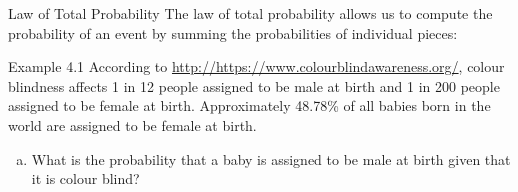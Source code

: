 \documentclass[aspectratio=169,xcolor=pdftex,dvipsnames,table]{beamer}\usepackage[]{graphicx}\usepackage[]{xcolor}
\begin{document}
\begin{frame}{Law of Total Probability}
  The law of total probability allows us to compute the probability of an event by summing the probabilities of individual pieces:
  
  \begin{center}
\end{center}

\end{frame}

\begin{frame}
  \begin{block}{Example 4.1}
    According to \url{http://https://www.colourblindawareness.org/}, colour blindness affects 1 in 12 people assigned to be male at birth and 1 in 200 people assigned to be female at birth. Approximately 48.78\% of all babies born in the world are assigned to be female at birth.

    \begin{enumerate}[d)]
      
    \item What is the probability that a baby is assigned to be male at birth given that it is colour blind?
      
    \end{enumerate}
  \end{block}
\end{frame}
\end{document}
